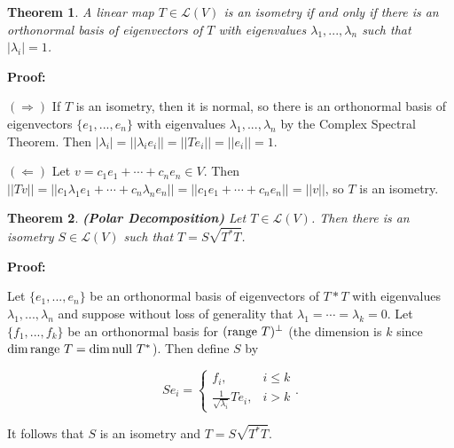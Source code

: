 \documentclass{article}
\theoremstyle{colontheorem}
\newtheorem{theorem}{Theorem}[section]
\newcommand{\Null}{\textnormal{null }}
\newcommand{\Range}{\textnormal{range }}
\newenvironment{Theorem}
{
	\begin{mdframed}[backgroundcolor=TheoremOrange!10]
	\begin{theorem}
}
{
	\end{theorem}
	\end{mdframed}
	
	\vspace{.15in}
}
\newenvironment{Proof}
{
	\vspace{-.3in}
	
	\begin{mdframed}[backgroundcolor=ProofPurple!10]
	\textbf{Proof:}%
}
{
	\end{mdframed}
	
	\vspace{.15in}
}
\begin{document}
\begin{Theorem}
	
	A linear map $T \in \mathcal{L}(V)$ is an isometry if and only if there is an orthonormal basis of eigenvectors of $T$ with eigenvalues $\lambda_1, ..., \lambda_n$ such that $|\lambda_i| = 1$.
	
\end{Theorem}



\begin{Proof}
	$(\Rightarrow)$ If $T$ is an isometry, then it is normal, so there is an orthonormal basis of eigenvectors $\{e_1, ..., e_n\}$ with eigenvalues $\lambda_1, ..., \lambda_n$ by the Complex Spectral Theorem. Then $|\lambda_i| = ||\lambda_i e_i|| = ||Te_i|| = ||e_i|| = 1$.\\
	
	\pagebreak
	
	$(\Leftarrow)$ Let $v = c_1 e_1 + \cdots + c_n e_n \in V$. Then $||Tv|| = ||c_1 \lambda_1 e_1 + \cdots + c_n \lambda_n e_n|| = ||c_1 e_1 + \cdots + c_n e_n|| = ||v||$, so $T$ is an isometry.
	
\end{Proof}



\begin{Theorem}
	
	\textbf{(Polar Decomposition)} Let $T \in \mathcal{L}(V)$. Then there is an isometry $S \in \mathcal{L}(V)$ such that $T = S\sqrt{T^* T}$.
	
\end{Theorem}



\begin{Proof}
	Let $\{e_1, ..., e_n\}$ be an orthonormal basis of eigenvectors of $T*T$ with eigenvalues $\lambda_1, ..., \lambda_n$ and suppose without loss of generality that $\lambda_1 = \cdots = \lambda_k = 0$. Let $\{f_1, ..., f_k\}$ be an orthonormal basis for $(\Range T)^\perp$ (the dimension is $k$ since $\dim \Range T = \dim \Null T^*$). Then define $S$ by
	
	$$
		Se_i = \begin{cases} 
			f_i, & i \leq k \\
			\frac{1}{\sqrt{\lambda_i}}Te_i, & i > k
		\end{cases}.
	$$
	
	It follows that $S$ is an isometry and $T = S \sqrt{T^* T}$.
	
\end{Proof}
\end{document}
